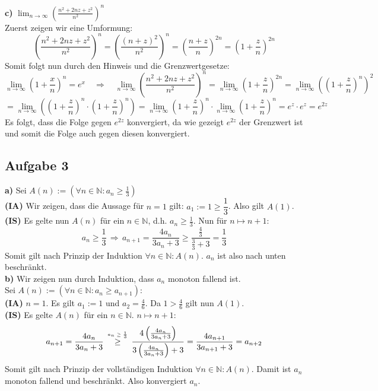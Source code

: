 \documentclass[a4paper,graphics,11pt]{article}
\newcommand{\aufgabe}[1]{\subsection*{Aufgabe #1}}
\newcommand{\up}[2]{\mathrel{\overset{\makebox[0pt]{\mbox{\normalfont\tiny #2}}}{#1}}}
\begin{document}
\newpage
\textbf{c)} $\lim_{n \to \infty}\limits \left(\frac{n^2+2nz+z^2}{n^2}\right)^n$\\[5pt]
Zuerst zeigen wir eine Umformung:
$$
    \left(\frac{n^2+2nz+z^2}{n^2}\right)^n = \left(\frac{(n+z)^2}{n^2}\right)^n
    = \left(\frac{n+z}{n}\right)^{2n} = \left(1+\frac{z}{n}\right)^{2n}
$$
Somit folgt nun durch den Hinweis und die Grenzwertgesetze:
$$
    \lim_{n \to \infty} \left(1+\frac{x}{n}\right)^n = e^x\quad\Longrightarrow\quad
    \lim_{n \to \infty} \left(\frac{n^2+2nz+z^2}{n^2}\right)^n
    = \lim_{n \to \infty} \left(1+\frac{z}{n}\right)^{2n}
    = \lim_{n \to \infty} \left(\left(1+\frac{z}{n}\right)^n\right)^2
$$$$
    = \lim_{n \to \infty} \left(\left(1+\frac{z}{n}\right)^{n} \cdot 
    \left(1+\frac{z}{n}\right)^{n}\right)
    = \lim_{n \to \infty} \left(1+\frac{z}{n}\right)^{n} \cdot 
    \lim_{n \to \infty} \left(1+\frac{z}{n}\right)^{n}
    = e^z \cdot e^z = e^{2z}
$$
Es folgt, dass die Folge gegen $e^{2z}$ konvergiert, da wie gezeigt $e^{2z}$ der Grenzwert
ist und somit die Folge auch gegen diesen konvergiert.
\aufgabe{3}
\textbf{a)} Sei $A(n) := \left(\forall n \in \mathbb{N}\colon a_n \geq \frac{1}{3}\right)$\\[5pt]
\textbf{(IA)} Wir zeigen, dass die Aussage für $n=1$ gilt: $a_1 := 1 \geq \dfrac{1}{3}$. Also gilt $A(1)$.\\[5pt]
\textbf{(IS)} Es gelte nun $A(n)$ für ein $n\in \mathbb{N}$, d.h. $a_n \geq \frac{1}{3}$. Nun für $n\mapsto n+1$:
$$
    a_n \geq \frac{1}{3} \,\Longrightarrow\, a_{n+1} = \frac{4a_n}{3a_n+3} \geq \frac{\frac{4}{3}}{\frac{3}{3} +3} = \frac{1}{3}
$$
Somit gilt nach Prinzip der Induktion $\forall n \in \mathbb{N}\colon A(n)$. $a_n$ ist also nach unten beschränkt.\\
\textbf{b)}
Wir zeigen nun durch Induktion, dass $a_n$ monoton fallend ist.\\Sei $A(n):=\left(\forall n \in \mathbb{N} \colon a_n \geq a_{n+1}\right)$:\\[5pt]
\textbf{(IA)} $n=1$. Es gilt $a_1 := 1$ und $a_2 = \frac{4}{6}$. Da $1 > \frac{4}{6}$ gilt nun $A(1)$.\\[5pt]
\textbf{(IS)} Es gelte $A(n)$ für ein $n \in \mathbb{N}$. $n\mapsto n+1$:
$$
    a_{n+1} = \frac{4a_n}{3a_n+3} \up{\quad\geq\quad}{$a_n \geq \frac{1}{3}$}
    \frac{4\left(\frac{4a_n}{3a_n+3}\right)}{3\left(\frac{4a_n}{3a_n+3}\right)+3}
    = \frac{4a_{n+1}}{3a_{n+1}+3} = a_{n+2}
$$
Somit gilt nach Prinzip der vollständigen Induktion $\forall n \in \mathbb{N}\colon A(n)$.
Damit ist $a_n$ monoton fallend und beschränkt. Also konvergiert $a_n$.
\end{document}
